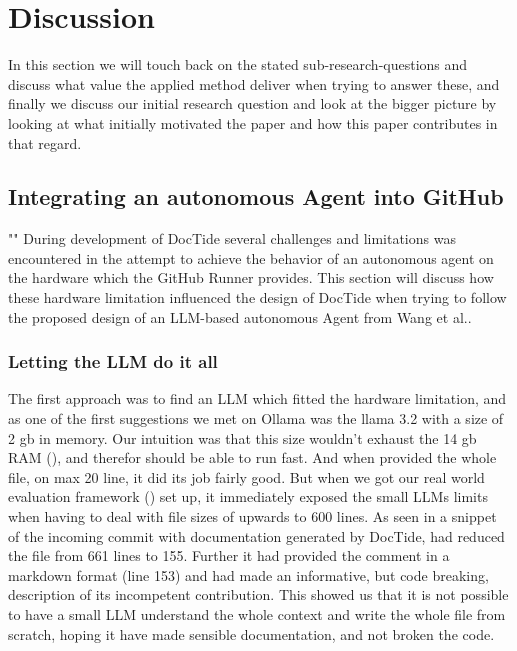 \section{Discussion}
In this section we will touch back on the stated sub-research-questions and discuss what value the applied method deliver when trying to answer these, and finally we discuss our initial research question and look at the bigger picture by looking at what initially motivated the paper and how this paper contributes in that regard.
\subsection{Integrating an autonomous Agent into GitHub}
\label{sec:DiscussionQ1}
"\textit{\subquestionI}"
During development of DocTide several challenges and limitations was encountered in the attempt to achieve the behavior of an autonomous agent on the hardware which the GitHub Runner provides. This section will discuss how these hardware limitation influenced the design of DocTide when trying to follow the proposed design of an LLM-based autonomous Agent from Wang et al.\cite{wang2024survey}.
\subsubsection*{Letting the LLM do it all}
The first approach was to find an LLM which fitted the hardware limitation, and as one of the first suggestions we met on Ollama was the llama 3.2 with a size of 2 gb in memory. Our intuition was that this size wouldn't exhaust the 14 gb RAM (), and therefor should be able to run fast. And when provided the whole file, on max 20 line, it did its job fairly good. But when we got our real world evaluation framework () set up, it immediately exposed the small LLMs limits when having to deal with file sizes of upwards to 600 lines. As seen in  a snippet of the incoming commit with documentation generated by DocTide, had reduced the file from 661 lines to 155. Further it had provided the comment in a markdown format (line 153) and had made an informative, but code breaking, description of its incompetent contribution. This showed us that it is not possible to have a small LLM understand the whole context and write the whole file from scratch, hoping it have made sensible documentation, and not broken the code. 

